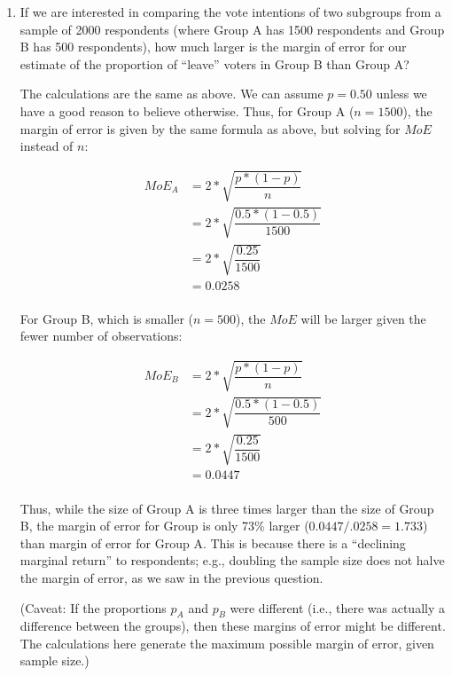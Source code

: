 \documentclass[a4paper]{exam}
\begin{document}
\begin{enumerate}
	\begin{enumerate}
	\item If we are interested in comparing the vote intentions of two subgroups from a sample of 2000 respondents (where Group A has 1500 respondents and Group B has 500 respondents), how much larger is the margin of error for our estimate of the proportion of ``leave'' voters in Group B than Group A?
	
	\begin{solution}
	
	The calculations are the same as above. We can assume $p=0.50$ unless we have a good reason to believe otherwise. Thus, for Group A ($n=1500$), the margin of error is given by the same formula as above, but solving for $MoE$ instead of $n$:
	
	\begin{align*}
	MoE_A & = 2*\sqrt{\dfrac{p * (1-p)}{n}} \\
	    & = 2*\sqrt{\dfrac{0.5 * (1-0.5)}{1500}} \\
	    & = 2*\sqrt{\dfrac{0.25}{1500}} \\
	    & = 0.0258 \\
	\end{align*}
	
	For Group B, which is smaller ($n=500$), the $MoE$ will be larger given the fewer number of observations:
	
	\begin{align*}
	MoE_B & = 2*\sqrt{\dfrac{p * (1-p)}{n}} \\
		& = 2*\sqrt{\dfrac{0.5 * (1-0.5)}{500}} \\
		& = 2*\sqrt{\dfrac{0.25}{1500}} \\
		& = 0.0447 \\
	\end{align*}
	
	Thus, while the size of Group A is three times larger than the size of Group B, the margin of error for Group is only 73\% larger ($0.0447/.0258 = 1.733$) than margin of error for Group A. This is because there is a ``declining marginal return'' to respondents; e.g., doubling the sample size does not halve the margin of error, as we saw in the previous question.
	
	(Caveat: If the proportions $p_A$ and $p_B$ were different (i.e., there was actually a difference between the groups), then these margins of error might be different. The calculations here generate the maximum possible margin of error, given sample size.)
	

\end{solution}
\end{enumerate}
\end{enumerate}
\end{document}
